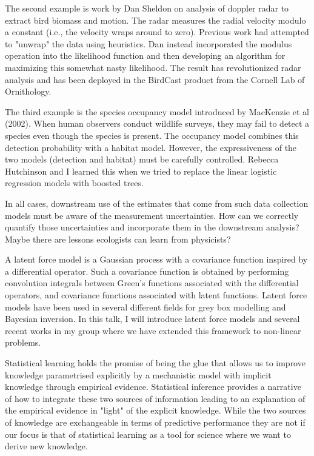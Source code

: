 The second example is work by Dan Sheldon on analysis of doppler radar
to extract bird biomass and motion. The radar measures the radial
velocity modulo a constant (i.e., the velocity wraps around to zero).
Previous work had attempted to "unwrap" the data using heuristics. Dan
instead incorporated the modulus operation into the likelihood function
and then developing an algorithm for maximizing this somewhat nasty
likelihood. The result has revolutionized radar analysis and has been
deployed in the BirdCast product from the Cornell Lab of Ornithology.

The third example is the species occupancy model introduced by MacKenzie
et al (2002). When human observers conduct wildlife surveys, they may
fail to detect a species even though the species is present. The
occupancy model combines this detection probability with a habitat
model. However, the expressiveness of the two models (detection and
habitat) must be carefully controlled. Rebecca Hutchinson and I learned
this when we tried to replace the linear logistic regression models with
boosted trees.

In all cases, downstream use of the estimates that come from such data
collection models must be aware of the measurement uncertainties. How
can we correctly quantify those uncertainties and incorporate them in
the downstream analysis? Maybe there are lessons ecologists can learn
from physicists?

\license

A latent force model is a Gaussian process with a covariance function inspired by a differential operator. Such a covariance function is obtained by performing convolution integrals between Green's functions associated with the differential operators, and covariance functions associated with latent functions. Latent force models have been used in several different fields for grey box modelling and Bayesian inversion. In this talk, I will introduce latent force models and several recent works in my group where we have extended this framework to non-linear problems.

\license

Statistical learning holds the promise of being the glue that allows us to improve knowledge parametrised explicitly by a mechanistic model with implicit knowledge through empirical evidence. Statistical inference provides a narrative of how to integrate these two sources of information leading to an explanation of the empirical evidence in "light" of the explicit knowledge. While the two sources of knowledge are exchangeable in terms of predictive performance they are not if our focus is that of statistical learning as a tool for science where we want to derive new knowledge.

